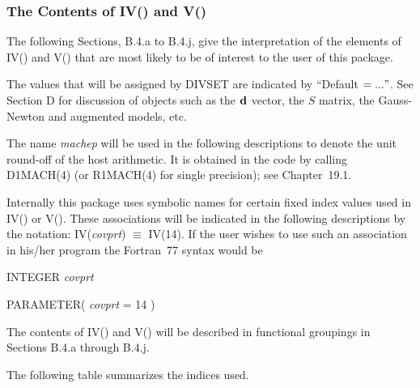 \documentclass[twoside]{MATH77}
\begin{document}
\subsubsection{The Contents of IV() and V()\label{PB4}}

The following Sections, B.4.a to B.4.j, give the interpretation of the
elements of IV() and V() that are most likely to be of interest to the user
of this package.

The values that will be assigned by DIVSET are indicated by ``Default $=
..." $. See Section D for discussion of objects such as the ${\bf d}$ vector, the
$S$ matrix, the Gauss-Newton and augmented models, etc.

The name {\em machep} will be used in the following descriptions to denote the
unit round-off of the host arithmetic. It is obtained in the code by calling
D1MACH(4) (or R1MACH(4) for single precision); see Chapter~19.1.

Internally this package uses symbolic names for certain fixed index values
used in IV() or V(). These associations will be indicated in the following
descriptions by the notation: IV({\em covprt}) $\equiv$ IV(14). If the user wishes
to use such an association in his/her program the Fortran~77 syntax would be

INTEGER {\em covprt}

PARAMETER( {\em covprt} = 14 )

The contents of IV() and V() will be described in functional groupings in
Sections B.4.a through B.4.j.

The following table summarizes the indices used.
\end{document}
